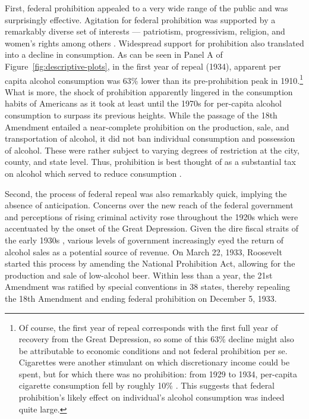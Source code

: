 \documentclass[12pt]{article}
\begin{document}
First, federal prohibition appealed to a very wide range of the public and was surprisingly effective. Agitation for federal prohibition was supported by a remarkably diverse set of interests — patriotism, progressivism, religion, and women's rights among others . 
Widespread support for prohibition also translated into a decline in consumption. 
As can be seen in Panel A of Figure~\ref{fig:descriptive-plots}, in the first year of repeal (1934), apparent per capita alcohol consumption was 63\% lower than its pre-prohibition peak in 1910.\footnote{Of course, the first year of repeal corresponds with the first full year of recovery from the Great Depression, so some of this 63\% decline might also be attributable to economic conditions and not federal prohibition per se. 
Cigarettes were another stimulant on which discretionary income could be spent, but for which there was no prohibition: from 1929 to 1934, per-capita cigarette consumption fell by roughly 10\% . 
This suggests that federal prohibition's likely effect on individual's alcohol consumption was indeed quite large.
}
What is more, the shock of prohibition apparently lingered in the consumption habits of Americans as it took at least until the 1970s for per-capita alcohol consumption to surpass its previous heights. 
While the passage of the 18th Amendment entailed a near-complete prohibition on the production, sale, and transportation of alcohol, it did not ban individual consumption and possession of alcohol. 
These were rather subject to varying degrees of restriction at the city, county, and state level. 
Thus, prohibition is best thought of as a substantial tax on alcohol which served to reduce consumption . 

Second, the process of federal repeal was also remarkably quick, implying the absence of anticipation. Concerns over the new reach of the federal government and perceptions of rising criminal activity rose throughout the 1920s  which were accentuated by the onset of the Great Depression. 
Given the dire fiscal straits of the early 1930s , various levels of government increasingly eyed the return of alcohol sales as a potential source of revenue. 
On March 22, 1933, Roosevelt started this process by amending the National Prohibition Act, allowing for the production and sale of low-alcohol beer. 
Within less than a year, the 21st Amendment was ratified by special conventions in 38 states, thereby repealing the 18th Amendment and ending federal prohibition on December 5, 1933.  
\end{document}
